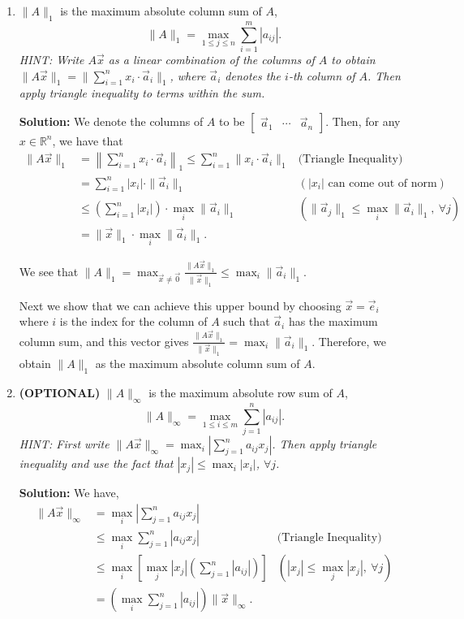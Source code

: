 \documentclass[10pt]{article}
\theoremstyle{definition}
\theoremstyle{plain}
\newcommand{\RR}{\mathbb{R}}
\begin{document}
\begin{enumerate}[label=(\alph*)]
\item $\|A\|_1$ is the maximum absolute column sum of $A$,
\begin{equation}
\|A\|_1 = \max_{1 \le j \le n} \sum_{i=1}^{m} |a_{ij}|.
\end{equation}
\textit{HINT: Write $A\vec{x}$ as a linear combination of the columns of $A$ to obtain $\|A\vec{x}\|_1 = \|\sum_{i=1}^{n} x_i \cdot \vec{a}_i\|_1$, where $\vec{a}_i$ denotes the $i$-th column of $A$. Then apply triangle inequality to terms within the sum.}

\textbf{Solution:} We denote the columns of $A$ to be $\begin{bmatrix} \vec{a}_1 & \cdots & \vec{a}_n \end{bmatrix}$. Then, for any $x \in \RR^n$, we have that
\begin{align}
\|A\vec{x}\|_1 &= \left\|\sum_{i=1}^{n} x_i \cdot \vec{a}_i\right\|_1 \le \sum_{i=1}^{n} \|x_i \cdot \vec{a}_i\|_1 & \text{(Triangle Inequality)} \\
&= \sum_{i=1}^{n} |x_i| \cdot \|\vec{a}_i\|_1 & (|x_i| \text{ can come out of norm}) \\
&\le \left(\sum_{i=1}^{n} |x_i|\right) \cdot \max_i \|\vec{a}_i\|_1 & (\|\vec{a}_j\|_1 \le \max_i \|\vec{a}_i\|_1, \ \forall j) \\
&= \|\vec{x}\|_1 \cdot \max_i \|\vec{a}_i\|_1.
\end{align}

We see that $\|A\|_1 = \max_{\vec{x} \neq \vec{0}} \frac{\|A\vec{x}\|_1}{\|\vec{x}\|_1} \le \max_i \|\vec{a}_i\|_1$.

Next we show that we can achieve this upper bound by choosing $\vec{x} = \vec{e}_i$ where $i$ is the index for the column of $A$ such that $\vec{a}_i$ has the maximum column sum, and this vector gives $\frac{\|A\vec{x}\|_1}{\|\vec{x}\|_1} = \max_i \|\vec{a}_i\|_1$. Therefore, we obtain $\|A\|_1$ as the maximum absolute column sum of $A$.

\item \textbf{(OPTIONAL)} $\|A\|_\infty$ is the maximum absolute row sum of $A$,
\begin{equation}
\|A\|_\infty = \max_{1 \le i \le m} \sum_{j=1}^{n} |a_{ij}|.
\end{equation}
\textit{HINT: First write $\|A\vec{x}\|_\infty = \max_i \left|\sum_{j=1}^{n} a_{ij} x_j\right|$. Then apply triangle inequality and use the fact that $|x_j| \le \max_i |x_i|$, $\forall j$.}

\textbf{Solution:} We have,
\begin{align}
\|A\vec{x}\|_\infty &= \max_i \left|\sum_{j=1}^{n} a_{ij} x_j\right| \\
&\le \max_i \sum_{j=1}^{n} |a_{ij} x_j| & \text{(Triangle Inequality)} \\
&\le \max_i \left[\max_j |x_j| \left(\sum_{j=1}^{n} |a_{ij}|\right)\right] & (|x_j| \le \max_j |x_j|, \ \forall j) \\
&= \left(\max_i \sum_{j=1}^{n} |a_{ij}|\right) \|\vec{x}\|_\infty.
\end{align}


\end{enumerate}
\end{document}

